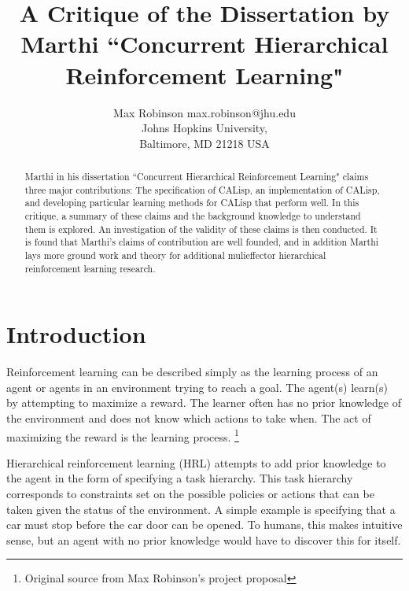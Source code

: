 \documentclass[jair,twoside,11pt,theapa]{article}
\begin{document}
\title{A Critique of the Dissertation by Marthi ``Concurrent Hierarchical Reinforcement Learning"}


\author{\name Max Robinson \email max.robinson@jhu.edu \\
       \addr Johns Hopkins University,\\
       Baltimore, MD 21218 USA
   }


\maketitle

\begin{abstract}
Marthi in his dissertation ``Concurrent Hierarchical Reinforcement Learning" claims three major contributions: The specification of CALisp, an implementation of CALisp, and developing particular learning methods for CALisp that perform well. In this critique, a summary of these claims and the background knowledge to understand them is explored. An investigation of the validity of these claims is then conducted. It is found that Marthi's claims of contribution are well founded, and in addition Marthi lays more ground work and theory for additional mulieffector hierarchical reinforcement learning research.
\end{abstract}

\section{Introduction}
\label{Introduction}
Reinforcement learning can be described simply as the learning process of an agent or agents in an environment trying to reach a goal. The agent(s) learn(s) by attempting to maximize a reward. The learner often has no prior knowledge of the environment and does not know which actions to take when. The act of maximizing the reward is the learning process. \footnote{Original source from Max Robinson's project proposal}

Hierarchical reinforcement learning (HRL) attempts to add prior knowledge to the agent in the form of specifying a task hierarchy. This task hierarchy corresponds to constraints set on the possible policies or actions that can be taken given the status of the environment. A simple example is specifying that a car must stop before the car door can be opened. To humans, this makes intuitive sense, but an agent with no prior knowledge would have to discover this for itself. 
\end{document}
